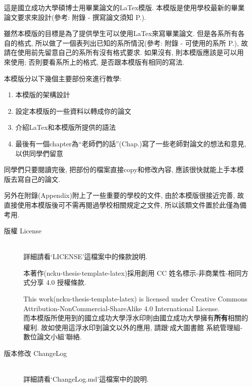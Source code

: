 
這是國立成功大學碩博士用畢業論文的LaTex模版. 本模版是使用學校最新的畢業論文要求來設計(參考: 附錄 - 撰寫論文須知 P.).

雖然本模版的目標是為了提供學生可以使用LaTex來寫畢業論文. 但是各系所有各自的格式, 所以做了一個表列出已知的系所情況(參考: 附錄 - 可使用的系所 P.), 故請在使用前先留意自己的系所有沒有格式要求. 如果沒有, 則本模版應該是可以用來使用; 否則要看系所上的格式, 是否跟本模版有相同的寫法.

本模版分以下幾個主要部份來進行教學:

\begin{enumerate}
  \item 本模版的架構設計
  \item 設定本模版的一些資料以轉成你的論文
  \item 介紹LaTex和本模版所提供的語法
  \item 最後有一個chapter為``老師們的話''(Chap.)寫了一些老師對論文的想法和意見, 以供同學們留意
\end{enumerate}

同學們只要閱讀完後, 把部份的檔案直接copy和修改內容, 應該很快就能上手本模版去寫自己的論文.

另外在附錄(Appendix)附上了一些重要的學校的文件, 由於本模版很接近完善, 故直接使用本模版後可不需再閱過學校相關規定之文件, 所以該類文件置於此僅為備考用.

\newpage

\begin{description}
  \item[版權 License]\hfill\\
  詳細請看`LICENSE'這檔案中的條款說明.\\


    本著作(ncku-thesis-template-latex)採用創用 CC 姓名標示-非商業性-相同方式分享 4.0 授權條款.

    This work(ncku-thesis-template-latex) is licensed under Creative Commons Attribution-NonCommercial-ShareAlike 4.0 International License.\\

  而本模版所使用到的國立成功大學浮水印則由國立成功大學擁有\textbf{所有}相關的權利. 故如使用這浮水印到論文以外的應用, 請跟`成大圖書館 系統管理組-數位論文小組'聯絡.

  \item[版本修改 ChangeLog]\hfill\\
  詳細請看`ChangeLog.md'這檔案中的說明.
\end{description}

\EndChapter
